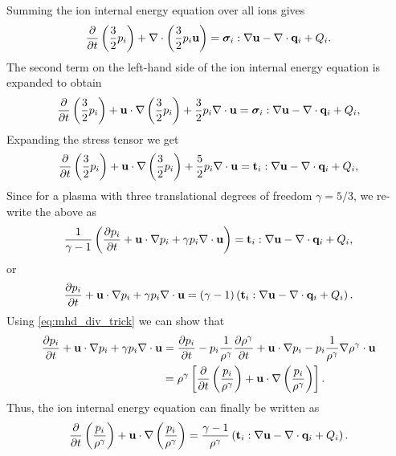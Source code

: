 \documentclass[a4paper,11pt]{report}
\begin{document}
Summing the ion internal energy equation over all ions gives
\begin{equation*}
    \frac{\partial}{\partial t} \left( \frac{3}{2} p_i \right) + \nabla \cdot \left( \frac{3}{2} p_i \mathbf{u} \right) = \bm \sigma_i : \nabla \mathbf{u} - \nabla \cdot \mathbf{q}_i + Q_i.
\end{equation*}
The second term on the left-hand side of the ion internal energy equation is expanded to obtain
\begin{equation*}
    \frac{\partial}{\partial t} \left( \frac{3}{2} p_i \right) + \mathbf{u} \cdot \nabla \left( \frac{3}{2} p_i \right) + \frac{3}{2}p_i \nabla \cdot \mathbf{u} = \bm \sigma_i : \nabla \mathbf{u} - \nabla \cdot \mathbf{q}_i + Q_i,
\end{equation*}
Expanding the stress tensor we get
\begin{equation*}
    \frac{\partial}{\partial t} \left( \frac{3}{2} p_i \right) + \mathbf{u} \cdot \nabla \left( \frac{3}{2} p_i \right) + \frac{5}{2} p_i \nabla \cdot \mathbf{u} = \mathbf{t}_i : \nabla \mathbf{u} - \nabla \cdot \mathbf{q}_i + Q_i,
\end{equation*}
Since for a plasma with three translational degrees of freedom $\gamma = 5/3$, we re-write the above as
\begin{equation*}
    \frac{1}{\gamma - 1} \left( \frac{\partial p_i}{\partial t} + \mathbf{u} \cdot \nabla p_i + \gamma p_i \nabla \cdot \mathbf{u} \right) = \mathbf{t}_i : \nabla \mathbf{u} - \nabla \cdot \mathbf{q}_i + Q_i,
\end{equation*}
or
\begin{equation*}
    \frac{\partial p_i}{\partial t} + \mathbf{u} \cdot \nabla p_i + \gamma p_i \nabla \cdot \mathbf{u} = (\gamma - 1) \left( \mathbf{t}_i : \nabla \mathbf{u} - \nabla \cdot \mathbf{q}_i + Q_i \right). 
\end{equation*}
Using \cref{eq:mhd_div_trick} we can show that
\begin{align*}
    \frac{\partial p_i}{\partial t} + \mathbf{u} \cdot \nabla p_i + \gamma p_i \nabla \cdot \mathbf{u} 
    &=  \frac{\partial p_i}{\partial t} - p_i \frac{1}{\rho^\gamma} \frac{\partial \rho^\gamma}{\partial t} + \mathbf{u} \cdot \nabla p_i - p_i \frac{1}{\rho^\gamma} \nabla \rho^\gamma \cdot \mathbf{u} \nonumber \\
    & = \rho^\gamma \left [ \frac{\partial}{\partial t} \left( \frac{p_i}{\rho^\gamma} \right) + \mathbf{u} \cdot \nabla \left(\frac{p_i}{\rho^\gamma} \right) \right ].
\end{align*}
Thus, the ion internal energy equation can finally be written as
\begin{equation*}
    \frac{\partial}{\partial t} \left( \frac{p_i}{\rho^\gamma} \right) + \mathbf{u} \cdot \nabla \left(\frac{p_i}{\rho^\gamma} \right) = \frac{\gamma - 1}{\rho^\gamma} \left( \mathbf{t}_i : \nabla \mathbf{u} - \nabla \cdot \mathbf{q}_i + Q_i \right).
\end{equation*}
\end{document}
